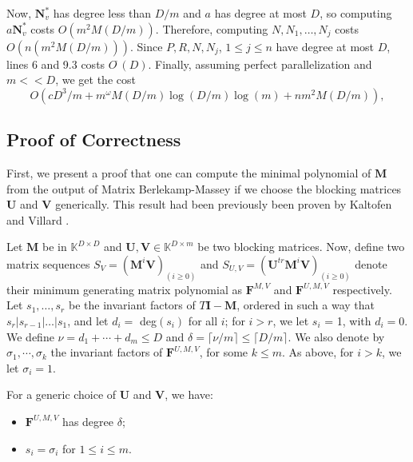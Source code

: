 \documentclass[12pt]{article}
\def\mF{\mathbf{F}}
\def\mI{\mathbf{I}}
\def\mM{\mathbf{M}}
\def\mN{\mathbf{N}}
\def\mU{\mathbf{U}}
\def\mV{\mathbf{V}}
\begin{document}
Now, $\mN_v^*$ has degree less than $D/m$ and $a$ has degree at most $D$, so
computing $a \mN_v^*$ costs $O(m^2M(D/m))$. Therefore, computing $N,N_1,\dots,N_j$ costs $O(n(m^2M(D/m)))$.
Since $P,R,N,N_j$, $1\le j \le n$
have degree at most $D$, lines 6 and 9.3 costs $O^{\tilde{~}}(D)$.
Finally, assuming perfect parallelization and $m << D$, we get the cost 
$$O(cD^3/m + m^{\omega} M(D/m) \log(D/m) \log(m) + nm^2M(D/m)),$$




\subsection{Proof of Correctness}

First, we present a proof that one can compute
the minimal polynomial of $\mM$ from the
output of Matrix Berlekamp-Massey if we choose
the blocking matrices $\mU$ and $\mV$ generically.
This result had been previously been proven by
Kaltofen and Villard \cite{KaVi04,Villard97a}.

Let $\mM$ be in $\mathbb{K}^{D \times D}$ and 
$\mU,\mV \in \mathbb{K}^{D \times m}$ be two blocking matrices. Now, define two matrix sequences
$S_V = (\mM^i \mV)_{(i \ge 0)}$ and 
$S_{U,V} = (\mU^{tr} \mM^i \mV)_{(i \ge 0)}$ denote their minimum
generating matrix polynomial as $\mF^{M,V}$ and $\mF^{U,M,V}$ respectively.
Let $s_1, \dots, s_r$ be the invariant factors
of $T\mI - \mM$, ordered in such a way that 
$s_r | s_{r-1}| \dots | s_1$, and let $d_i = $ deg$(s_i)$ for
all $i$; for $i > r$, we let $s_i$ = 1, with $d_i = 0$.
We define $\nu = d_1 + \cdots + d_m \le D$ and
$\delta = \lceil \nu / m \rceil \le \lceil D / m \rceil$.
We also denote by $\sigma_1, \cdots, \sigma_k$ the invariant
factors of $\mF^{U,M,V}$, for some $k \le m$. As above,
for $i > k$, we let $\sigma_i = 1$.

\begin{theorem}
	\label{randXY}
	For a generic choice of $\mU$ and $\mV$, we have:
	\begin{itemize}
		\item $\mF^{U,M,V}$ has degree $\delta$;
		\item $s_i = \sigma_i$ for $1 \le i \le m$.
	\end{itemize}
\end{theorem}
\end{document}
